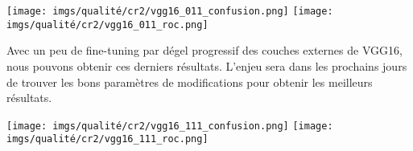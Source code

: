 \documentclass{article}
\begin{document}
\begin{center}
    \texttt{[image: imgs/qualité/cr2/vgg16\_011\_confusion.png]}
    \texttt{[image: imgs/qualité/cr2/vgg16\_011\_roc.png]}
\end{center}

Avec un peu de fine-tuning par dégel progressif des couches externes de VGG16, nous pouvons obtenir ces derniers résultats. L'enjeu sera dans les prochains jours de trouver les bons paramètres de modifications pour obtenir les meilleurs résultats.


\begin{center}
    \texttt{[image: imgs/qualité/cr2/vgg16\_111\_confusion.png]}
    \texttt{[image: imgs/qualité/cr2/vgg16\_111\_roc.png]}
\end{center}
\end{document}
